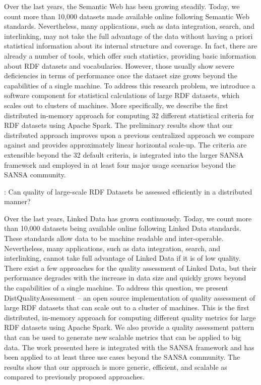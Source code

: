 Over the last years, the Semantic Web has been growing steadily. Today, we count more than 10,000 datasets made available online following Semantic Web standards.
Nevertheless, many applications, such as data integration, search, and interlinking, may not take the full advantage of the data without having a priori statistical information about its internal structure and coverage.
In fact, there are already a number of tools, which offer such statistics, providing basic information about \gls{RDF} datasets and vocabularies.
However, those usually show severe deficiencies in terms of performance once the dataset size grows beyond the capabilities of a single machine.
To address this research problem, we introduce a software component for statistical calculations of large RDF datasets, which scales out to clusters of machines.
More specifically, we describe the first distributed in-memory approach for computing 32 different statistical criteria for \gls{RDF} datasets using Apache Spark.
The preliminary results show that our distributed approach improves upon a previous centralized approach we compare against and provides approximately linear horizontal scale-up. 
The criteria are extensible beyond the 32 default criteria, is integrated into the larger SANSA framework and employed in at least four major usage scenarios beyond the SANSA community.

\begin{tcolorbox}
\textbf{\rqNr[RQ2]\label{rq:2}}: Can quality of large-scale RDF Datasets be assessed efficiently in a distributed manner?
\end{tcolorbox}

Over the last years, Linked Data has grown continuously. 
Today, we count more than 10,000 datasets being available online following Linked Data standards. 
These standards allow data to be machine readable and inter-operable.  
Nevertheless, many applications, such as data integration, search, and interlinking, cannot take full advantage of Linked Data if it is of low quality.
There exist a few approaches for the quality assessment of Linked Data, but their performance degrades with the increase in data size and quickly grows beyond the capabilities of a single machine.
To address this question, we present DistQualityAssessment -- an open source implementation of quality assessment of large RDF datasets that can scale out to a cluster of machines.
This is the first distributed, in-memory approach for computing different quality metrics for large \gls{RDF} datasets using Apache Spark. We also provide a quality assessment pattern that can be used to generate new scalable metrics that can be applied to big data.
The work presented here is integrated with the SANSA framework and has been applied to at least three use cases beyond the SANSA community.   
The results show that our approach is more generic, efficient, and scalable as compared to previously proposed approaches.

